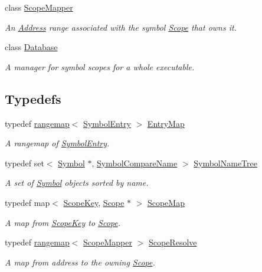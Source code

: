 \begin{DoxyCompactItemize}
class \mbox{\hyperlink{class_scope_mapper}{Scope\+Mapper}}
\begin{DoxyCompactList}\small\item\em An \mbox{\hyperlink{class_address}{Address}} range associated with the symbol \mbox{\hyperlink{class_scope}{Scope}} that owns it. \end{DoxyCompactList}\item 
class \mbox{\hyperlink{class_database}{Database}}
\begin{DoxyCompactList}\small\item\em A manager for symbol scopes for a whole executable. \end{DoxyCompactList}\end{DoxyCompactItemize}
\subsection*{Typedefs}
\begin{DoxyCompactItemize}
\item 
typedef \mbox{\hyperlink{classrangemap}{rangemap}}$<$ \mbox{\hyperlink{class_symbol_entry}{Symbol\+Entry}} $>$ \mbox{\hyperlink{database_8hh_a44a8ea0c0009b316b2651d374e5d4260}{Entry\+Map}}
\begin{DoxyCompactList}\small\item\em A rangemap of \mbox{\hyperlink{class_symbol_entry}{Symbol\+Entry}}. \end{DoxyCompactList}\item 
typedef set$<$ \mbox{\hyperlink{class_symbol}{Symbol}} $\ast$, \mbox{\hyperlink{class_symbol_compare_name}{Symbol\+Compare\+Name}} $>$ \mbox{\hyperlink{database_8hh_a6ed1db9b39a7f86a7a00b392bbe3f0d1}{Symbol\+Name\+Tree}}
\begin{DoxyCompactList}\small\item\em A set of \mbox{\hyperlink{class_symbol}{Symbol}} objects sorted by name. \end{DoxyCompactList}\item 
typedef map$<$ \mbox{\hyperlink{class_scope_key}{Scope\+Key}}, \mbox{\hyperlink{class_scope}{Scope}} $\ast$ $>$ \mbox{\hyperlink{database_8hh_a471f91376cdded8bf673b01d6e85f700}{Scope\+Map}}
\begin{DoxyCompactList}\small\item\em A map from \mbox{\hyperlink{class_scope_key}{Scope\+Key}} to \mbox{\hyperlink{class_scope}{Scope}}. \end{DoxyCompactList}\item 
typedef \mbox{\hyperlink{classrangemap}{rangemap}}$<$ \mbox{\hyperlink{class_scope_mapper}{Scope\+Mapper}} $>$ \mbox{\hyperlink{database_8hh_ada192c66697381e90aa3ab34196f9ad7}{Scope\+Resolve}}
\begin{DoxyCompactList}\small\item\em A map from address to the owning \mbox{\hyperlink{class_scope}{Scope}}. \end{DoxyCompactList}\end{DoxyCompactItemize}


